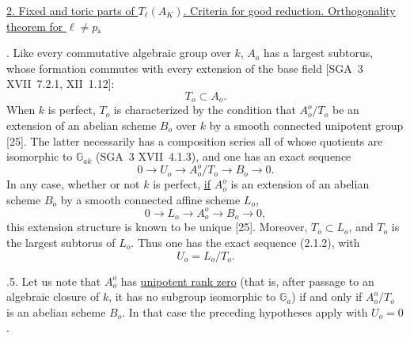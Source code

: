 
\medskip
\noindent
\underline{2. Fixed and toric parts of $T_\ell(A_K)$.  Criteria for
good reduction.  Orthogonality theorem for $\ell\ne p$.}

\medskip
{}. Like every commutative algebraic group over $k$, $A_o$ has a
largest subtorus, whose formation commutes with every extension of the
base field [SGA~3 XVII~7.2.1, XII~1.12]:
\begin{equation}\tag{2.1.1}
 T_o\subset A_o.
\end{equation}
When $k$ is perfect, $T_o$ is characterized by the condition that
$A_o^o/T_o$ be an extension of an abelian scheme $B_o$ over $k$ by a
smooth connected unipotent group [25].  The latter necessarily has a
composition series all of whose quotients are isomorphic to
$\mathbb G_{ak}$ (SGA~3 XVII~4.1.3), and one has an exact sequence
\begin{equation}\tag{2.1.2}
 0\longrightarrow U_o\longrightarrow A_o^o/T_o
 \longrightarrow B_o\longrightarrow0.
\end{equation}
In any case, whether or not $k$ is perfect, \underline{if} $A_o^o$ is
an extension of an abelian scheme $B_o$ by a smooth connected affine
scheme $L_o$,
\begin{equation}\tag{2.1.3}
 0\longrightarrow L_o\longrightarrow A_o^o
 \longrightarrow B_o\longrightarrow0,
\end{equation}
this extension structure is known to be unique [25].  Moreover,
$T_o\subset L_o$, and $T_o$ is the largest subtorus of $L_o$.  Thus
one has the exact sequence (2.1.2), with
\begin{equation}\tag{2.1.4}
 U_o=L_o/T_o.
\end{equation}

\medskip
{}.5. Let us note that $A_o^o$ has \underline{unipotent rank zero}
(that is, after passage to an algebraic closure of $k$, it has no
subgroup isomorphic to $\mathbb G_a$) if and only if $A_o^o/T_o$ is an
abelian scheme $B_o$.  In that case the preceding hypotheses apply
with $U_o=0$.

